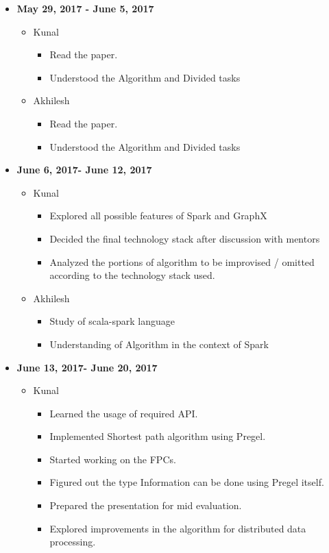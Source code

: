 \documentclass{easychair}
\begin{document}
\begin{itemize}
    \item \textbf{May 29, 2017 -  June 5, 2017}
    \begin{itemize}
    \item Kunal 
    \begin{itemize}
    \item Read the paper.
\item Understood the Algorithm and Divided tasks
 \end{itemize}
 
 \item Akhilesh
  \begin{itemize}
   \item Read the paper.
\item Understood the Algorithm and Divided tasks
 \end{itemize}
 
    \end{itemize}
    
     \item \textbf{June 6, 2017- June 12, 2017}
    \begin{itemize}
    
    \item Kunal 
    \begin{itemize}
    \item Explored all possible features of Spark and GraphX 
\item Decided the final technology stack after discussion with mentors
\item Analyzed the portions of algorithm to be improvised / omitted according to the technology stack used.

 \end{itemize}
 
 \item Akhilesh
  \begin{itemize}
   \item Study of scala-spark language
   \item Understanding of Algorithm in the context of Spark


 \end{itemize}
 
    \end{itemize}
    
     \item \textbf{June 13, 2017- June 20, 2017}
    \begin{itemize}
    
    \item Kunal 
    \begin{itemize}
    \item Learned the usage of required API.
\item Implemented Shortest path algorithm using Pregel.
\item Started working on the FPCs.
\item Figured out the type Information can be done using Pregel itself. 
\item Prepared the presentation for mid evaluation. 
\item Explored improvements in the algorithm for distributed data processing. 


\end{itemize}
\end{itemize}
\end{itemize}
\end{document}
